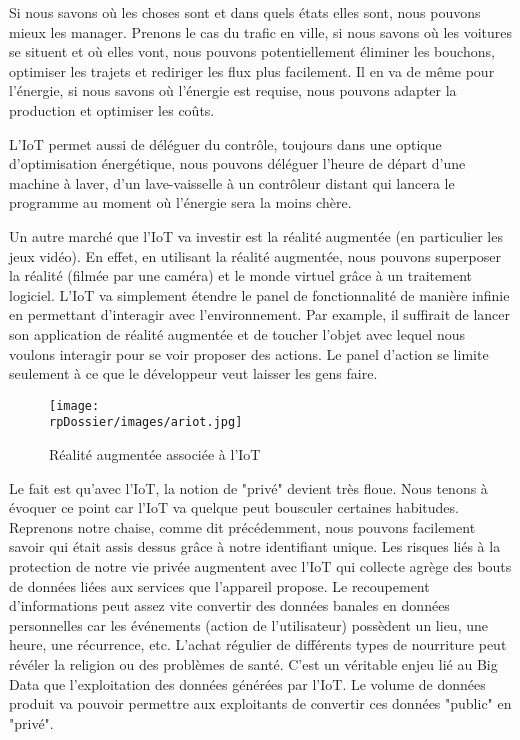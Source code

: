 Si nous savons où les choses sont et dans quels états elles sont, nous pouvons mieux les manager. Prenons le cas du trafic en ville, si nous savons où les voitures se situent et où elles vont, nous pouvons potentiellement éliminer les bouchons, optimiser les trajets et rediriger les flux plus facilement. Il en va de même pour l'énergie, si nous savons où l'énergie est requise, nous pouvons adapter la production et optimiser les coûts.


L'IoT permet aussi de déléguer du contrôle, toujours dans une optique d'optimisation énergétique, nous pouvons déléguer l'heure de départ d'une machine à laver, d'un lave-vaisselle à un contrôleur distant qui lancera le programme au moment où l'énergie sera la moins chère.


Un autre marché que l'IoT va investir est la réalité augmentée (en particulier les jeux vidéo). En effet, en utilisant la réalité augmentée, nous pouvons superposer la réalité (filmée par une caméra) et le monde virtuel grâce à un traitement logiciel. L'IoT va simplement étendre le panel de fonctionnalité de manière infinie en permettant d'interagir avec l'environnement. Par example, il suffirait de lancer son application de réalité augmentée et de toucher l'objet avec lequel nous voulons interagir pour se voir proposer des actions. Le panel d'action se limite seulement à ce que le développeur veut laisser les gens faire.

\begin{figure}[H]
\centering
\texttt{[image: \\rpDossier/images/ariot.jpg]}
\caption{Réalité augmentée associée à l’IoT}
\label{ariot}
\end{figure}


Le fait est qu'avec l'IoT, la notion de "privé" devient très floue. Nous tenons à évoquer ce point car l'IoT va quelque peut bousculer certaines habitudes. Reprenons notre chaise, comme dit précédemment, nous pouvons facilement savoir qui était assis dessus grâce à notre identifiant unique. Les risques liés à la protection de notre vie privée augmentent avec l'IoT qui collecte agrège des bouts de données liées aux services que l'appareil propose. Le recoupement d'informations peut assez vite convertir des données banales en données personnelles car les événements (action de l'utilisateur) possèdent un lieu, une heure, une récurrence, etc. L'achat régulier de différents types de nourriture peut révéler la religion ou des problèmes de santé. C'est un véritable enjeu lié au Big Data que l'exploitation des données générées par l'IoT. Le volume de données produit va pouvoir permettre aux exploitants de convertir ces données "public" en "privé".

